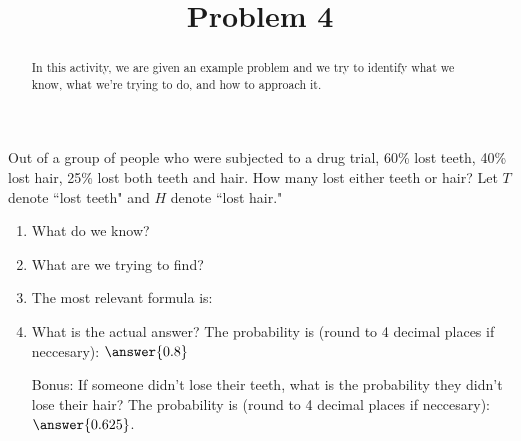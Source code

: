 \documentclass{ximera}
\title{Problem 4}
\begin{document}
      
\begin{abstract}
      
In this activity, we are given an example problem and we try to identify what we know, what we're trying to do, and how to approach it.
      
\end{abstract}
      
\maketitle
      
 
Out of a group of people who were subjected to a drug trial, 60\% lost teeth, 40\% lost hair, 25\% lost both teeth and hair.  How many lost either teeth or hair?  Let $T$ denote ``lost teeth" and $H$ denote ``lost hair."

 
 \begin{enumerate}
\item What do we know?

\begin{selectAll}
\end{selectAll}

\item What are we trying to find?

\begin{multipleChoice}




\end{multipleChoice}

\item The most relevant formula is:

\begin{multipleChoice}
\end{multipleChoice}

\item What is the actual answer?  The probability is (round to 4 decimal places if neccesary): $\answer{0.8}$

\item[Bonus:] If someone didn't lose their teeth, what is the probability they didn't lose their hair?  The probability is (round to 4 decimal places if neccesary): $\answer{0.625}$.

\end{enumerate}

 
 
 
 
      
\end{document}

